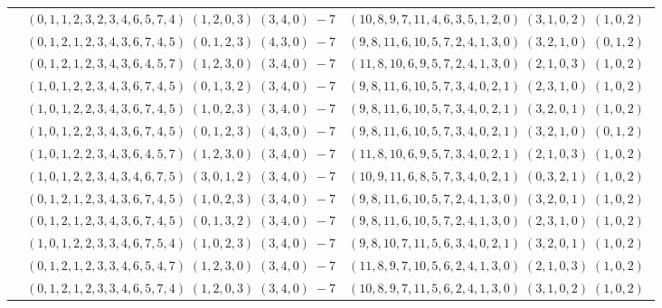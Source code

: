 \documentclass[11pt]{article}
\begin{document}
\begin{longtable}[l]{|c|c|c|}
 \cline{2-3} 
 & $(0 ,1 ,1 ,2 ,3 ,2 ,3 ,4 ,6 ,5 ,7 ,4) \;(1 ,2 ,0 ,3) \;(3 ,4 ,0) \;-7$ & $(10 ,8 ,9 ,7 ,11 ,4 ,6 ,3 ,5 ,1 ,2 ,0) \;(3 ,1 ,0 ,2) \;(1 ,0 ,2) \;$\\ 
 \cline{2-3} 
 & $(0 ,1 ,2 ,1 ,2 ,3 ,4 ,3 ,6 ,7 ,4 ,5) \;(0 ,1 ,2 ,3) \;(4 ,3 ,0) \;-7$ & $(9 ,8 ,11 ,6 ,10 ,5 ,7 ,2 ,4 ,1 ,3 ,0) \;(3 ,2 ,1 ,0) \;(0 ,1 ,2) \;$\\ 
 \cline{2-3} 
 & $(0 ,1 ,2 ,1 ,2 ,3 ,4 ,3 ,6 ,4 ,5 ,7) \;(1 ,2 ,3 ,0) \;(3 ,4 ,0) \;-7$ & $(11 ,8 ,10 ,6 ,9 ,5 ,7 ,2 ,4 ,1 ,3 ,0) \;(2 ,1 ,0 ,3) \;(1 ,0 ,2) \;$\\ 
 \cline{2-3} 
 & $(1 ,0 ,1 ,2 ,2 ,3 ,4 ,3 ,6 ,7 ,4 ,5) \;(0 ,1 ,3 ,2) \;(3 ,4 ,0) \;-7$ & $(9 ,8 ,11 ,6 ,10 ,5 ,7 ,3 ,4 ,0 ,2 ,1) \;(2 ,3 ,1 ,0) \;(1 ,0 ,2) \;$\\ 
 \cline{2-3} 
 & $(1 ,0 ,1 ,2 ,2 ,3 ,4 ,3 ,6 ,7 ,4 ,5) \;(1 ,0 ,2 ,3) \;(3 ,4 ,0) \;-7$ & $(9 ,8 ,11 ,6 ,10 ,5 ,7 ,3 ,4 ,0 ,2 ,1) \;(3 ,2 ,0 ,1) \;(1 ,0 ,2) \;$\\ 
 \cline{2-3} 
 & $(1 ,0 ,1 ,2 ,2 ,3 ,4 ,3 ,6 ,7 ,4 ,5) \;(0 ,1 ,2 ,3) \;(4 ,3 ,0) \;-7$ & $(9 ,8 ,11 ,6 ,10 ,5 ,7 ,3 ,4 ,0 ,2 ,1) \;(3 ,2 ,1 ,0) \;(0 ,1 ,2) \;$\\ 
 \cline{2-3} 
 & $(1 ,0 ,1 ,2 ,2 ,3 ,4 ,3 ,6 ,4 ,5 ,7) \;(1 ,2 ,3 ,0) \;(3 ,4 ,0) \;-7$ & $(11 ,8 ,10 ,6 ,9 ,5 ,7 ,3 ,4 ,0 ,2 ,1) \;(2 ,1 ,0 ,3) \;(1 ,0 ,2) \;$\\ 
 \cline{2-3} 
 & $(1 ,0 ,1 ,2 ,2 ,3 ,4 ,3 ,4 ,6 ,7 ,5) \;(3 ,0 ,1 ,2) \;(3 ,4 ,0) \;-7$ & $(10 ,9 ,11 ,6 ,8 ,5 ,7 ,3 ,4 ,0 ,2 ,1) \;(0 ,3 ,2 ,1) \;(1 ,0 ,2) \;$\\ 
 \cline{2-3} 
 & $(0 ,1 ,2 ,1 ,2 ,3 ,4 ,3 ,6 ,7 ,4 ,5) \;(1 ,0 ,2 ,3) \;(3 ,4 ,0) \;-7$ & $(9 ,8 ,11 ,6 ,10 ,5 ,7 ,2 ,4 ,1 ,3 ,0) \;(3 ,2 ,0 ,1) \;(1 ,0 ,2) \;$\\ 
 \cline{2-3} 
 & $(0 ,1 ,2 ,1 ,2 ,3 ,4 ,3 ,6 ,7 ,4 ,5) \;(0 ,1 ,3 ,2) \;(3 ,4 ,0) \;-7$ & $(9 ,8 ,11 ,6 ,10 ,5 ,7 ,2 ,4 ,1 ,3 ,0) \;(2 ,3 ,1 ,0) \;(1 ,0 ,2) \;$\\ 
 \cline{2-3} 
 & $(1 ,0 ,1 ,2 ,2 ,3 ,3 ,4 ,6 ,7 ,5 ,4) \;(1 ,0 ,2 ,3) \;(3 ,4 ,0) \;-7$ & $(9 ,8 ,10 ,7 ,11 ,5 ,6 ,3 ,4 ,0 ,2 ,1) \;(3 ,2 ,0 ,1) \;(1 ,0 ,2) \;$\\ 
 \cline{2-3} 
 & $(0 ,1 ,2 ,1 ,2 ,3 ,3 ,4 ,6 ,5 ,4 ,7) \;(1 ,2 ,3 ,0) \;(3 ,4 ,0) \;-7$ & $(11 ,8 ,9 ,7 ,10 ,5 ,6 ,2 ,4 ,1 ,3 ,0) \;(2 ,1 ,0 ,3) \;(1 ,0 ,2) \;$\\ 
 \cline{2-3} 
 & $(0 ,1 ,2 ,1 ,2 ,3 ,3 ,4 ,6 ,5 ,7 ,4) \;(1 ,2 ,0 ,3) \;(3 ,4 ,0) \;-7$ & $(10 ,8 ,9 ,7 ,11 ,5 ,6 ,2 ,4 ,1 ,3 ,0) \;(3 ,1 ,0 ,2) \;(1 ,0 ,2) \;$\\ 

\end{longtable}
\end{document}
